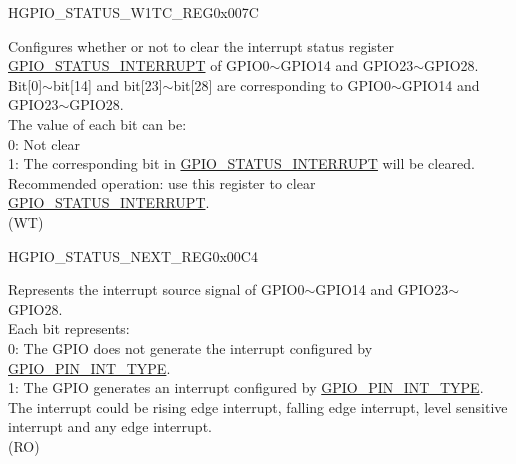 \begin{register}{H}{GPIO\_STATUS\_W1TC\_REG}{0x007C}\label{regdesc:GPIOSTATUSW1TCREG}
%
\regnewline%
\begin{regdesc}\begin{reglist}
\label{fielddesc:GPIOSTATUSW1TC}\item [GPIO\_STATUS\_W1TC] Configures whether or not to clear the interrupt status register \hyperref[fielddesc:GPIOSTATUSINTERRUPT]{GPIO\_STATUS\_INTERRUPT} of GPIO0$\sim$GPIO14 and GPIO23$\sim$GPIO28.\\ 
Bit[0]$\sim$bit[14] and bit[23]$\sim$bit[28] are corresponding to GPIO0$\sim$GPIO14 and GPIO23$\sim$GPIO28.\\
The value of each bit can be:\\
0: Not clear\\
1: The corresponding bit in \hyperref[fielddesc:GPIOSTATUSINTERRUPT]{GPIO\_STATUS\_INTERRUPT} will be cleared. \\
Recommended operation: use this register to clear \hyperref[fielddesc:GPIOSTATUSINTERRUPT]{GPIO\_STATUS\_INTERRUPT}.\\
(WT)
\end{reglist}\end{regdesc}
\end{register}


\begin{register}{H}{GPIO\_STATUS\_NEXT\_REG}{0x00C4}\label{regdesc:GPIOSTATUSNEXTREG}
%
\regnewline%
\begin{regdesc}\begin{reglist}
\label{fielddesc:GPIOSTATUSINTERRUPTNEXT}\item [GPIO\_STATUS\_INTERRUPT\_NEXT] Represents the interrupt source signal of GPIO0$\sim$GPIO14 and GPIO23$\sim$GPIO28.\\
Each bit represents:\\
0: The GPIO does not generate the interrupt configured by \hyperref[fielddesc:GPIOPINNINTTYPE]{GPIO\_PIN\_INT\_TYPE}.\\
1: The GPIO generates an interrupt configured by \hyperref[fielddesc:GPIOPINNINTTYPE]{GPIO\_PIN\_INT\_TYPE}.\\
The interrupt could be rising edge interrupt, falling edge interrupt, level sensitive interrupt and any edge interrupt.\\ (RO)
\end{reglist}\end{regdesc}
\end{register}


